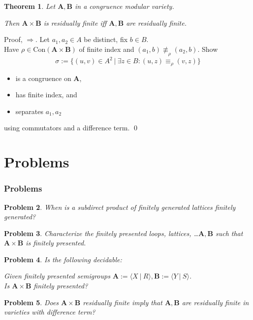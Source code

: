 \documentclass{beamer}
\newtheorem{thm}{Theorem}
\newtheorem{que}[thm]{Problem}
\theoremstyle{definition}
\newcommand{\setsuchthat}{\ \pmb{|}\ }
\newcommand{\Con}{\mathrm{Con}}
\newcommand{\A}{{\mathbf A}}
\newcommand{\B}{{\mathbf B}}
\begin{document}
\begin{frame}

\begin{thm}
 Let $\A,\B$ in a congruence modular variety.

 Then $\A\times\B$ is residually finite iff $\A,\B$ are residually finite.
\end{thm}


\begin{block}{Proof, $\Rightarrow$.}
 Let $a_1,a_2\in A$ be distinct, fix $b\in B$. \\
 Have $\rho\in\Con(\A\times\B)$ of finite index and $(a_1,b)\not\equiv_\rho (a_2,b)$.
 Show
\[ \sigma := \{ (u,v)\in A^2 \setsuchthat \exists z\in B\colon (u,z) \equiv_\rho (v,z) \} \]
\vspace{-7mm}
\begin{itemize}
\item is a congruence on $\A$,
\item has finite index, and
\item separates $a_1,a_2$
\end{itemize}
 using commutators and a difference term.
\qed
\end{block}

\end{frame}



\section{Problems}


\begin{frame}
\frametitle{Problems} 

\begin{que}
 When is a subdirect product of finitely generated lattices finitely generated?
\end{que}

\begin{que}
 Characterize the finitely presented loops, lattices, \dots $\A,\B$ such that $\A\times\B$
 is finitely presented.
\end{que}

\begin{que}
 Is the following decidable:

 Given finitely presented semigroups
 $\A := \langle X\setsuchthat R\rangle, \B := \langle Y\setsuchthat S\rangle$. \\
 Is $\A\times\B$ finitely presented?
\end{que}

\begin{que}
 Does $\A\times\B$ residually finite imply that $\A,\B$ are residually finite
 in varieties with difference term?
\end{que}
\end{frame}
 
\end{document}
